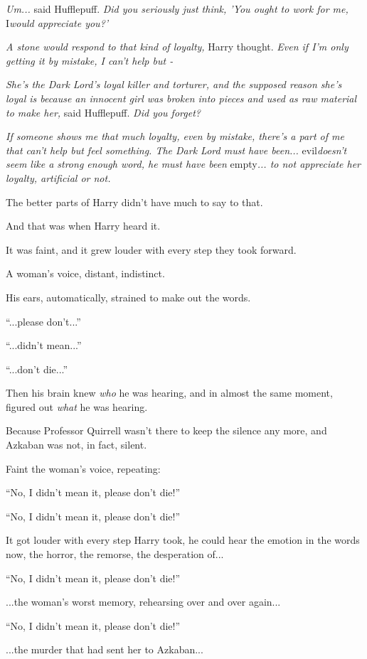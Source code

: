 \emph{Um...} said Hufflepuff. \emph{Did you seriously just think,
'You ought to work for me,} I\emph{would appreciate you?'}

\emph{A stone would respond to that kind of loyalty,} Harry thought.
\emph{Even if I'm only getting it by mistake, I can't help but -}

\emph{She's the Dark Lord's loyal killer and torturer, and the supposed
reason she's loyal is because an innocent girl was broken into pieces
and used as raw material to make her,} said Hufflepuff. \emph{Did you
forget?}

\emph{If someone shows me that much loyalty, even by mistake, there's a
part of me that can't help but feel something. The Dark Lord must have
been...} evil\emph{doesn't seem like a strong enough word, he must
have been} empty\emph{... to not appreciate her loyalty, artificial
or not.}

The better parts of Harry didn't have much to say to that.

And that was when Harry heard it.

It was faint, and it grew louder with every step they took forward.

A woman's voice, distant, indistinct.

His ears, automatically, strained to make out the words.

``...please don't...''

``...didn't mean...''

``...don't die...''

Then his brain knew \emph{who} he was hearing, and in almost the same
moment, figured out \emph{what} he was hearing.

Because Professor Quirrell wasn't there to keep the silence any more,
and Azkaban was not, in fact, silent.

Faint the woman's voice, repeating:

``No, I didn't mean it, please don't die!''

``No, I didn't mean it, please don't die!''

It got louder with every step Harry took, he could hear the emotion in
the words now, the horror, the remorse, the desperation of...

``No, I didn't mean it, please don't die!''

...the woman's worst memory, rehearsing over and over again...

``No, I didn't mean it, please don't die!''

...the murder that had sent her to Azkaban...


